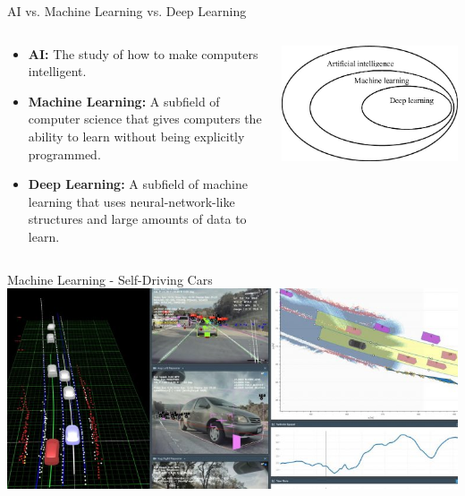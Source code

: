 \documentclass[]{beamer}
\begin{document}
\begin{frame}{AI vs. Machine Learning vs. Deep Learning}

    \begin{columns}
        \begin{column}{0.5\textwidth}
            \begin{itemize}
                \item \textbf{AI:} The study of how to make computers intelligent.
                \item \textbf{Machine Learning:} A subfield of computer science that gives computers the ability to learn without being explicitly programmed.
                \item \textbf{Deep Learning:} A subfield of machine learning that uses neural-network-like structures and large amounts of data to learn.
            \end{itemize}
        \end{column}
        \begin{column}{0.5\textwidth}
            \includegraphics[width=\textwidth]{imgs/ai_diagram.jpg}
        \end{column}
    \end{columns}

\end{frame}

\begin{frame}{Machine Learning - Self-Driving Cars}
    \includegraphics[width=\textwidth]{imgs/vis_6.jpg}
\end{frame}
\end{document}
